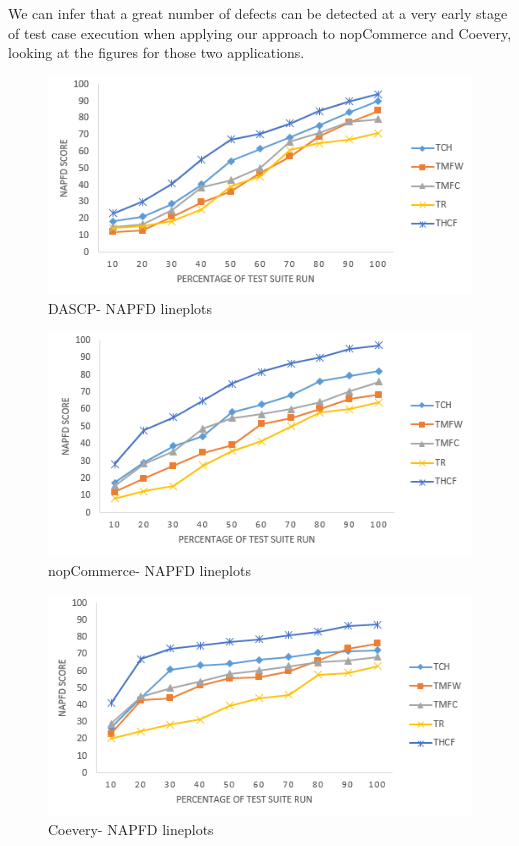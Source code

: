 We can infer that a great number of defects can be 
detected at a very early stage of test case execution when applying our approach
to nopCommerce and Coevery, looking at the figures for those two applications.

\begin{figure}[!ht]
        \centering
        \includegraphics[width=1.0\linewidth]{./DASCP-npfd.png}
        \caption{DASCP- NAPFD lineplots}
        \label{fig:DASCP-npfd}
\end{figure}

\begin{figure}[!ht]
        \centering
        \includegraphics[width=1.0\linewidth]{./nop-npfd.png}
        \caption{nopCommerce- NAPFD lineplots}
        \label{fig:nop-npfd}
\end{figure}

\begin{figure}[!ht]
        \centering
        \includegraphics[width=1.0\linewidth]{./Coevery-npfd.png}
        \caption{Coevery- NAPFD lineplots}
        \label{fig:coevery-npfd}
\end{figure}


